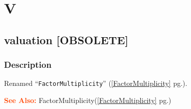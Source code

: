 \documentclass[a4paper]{mybook}
\newenvironment{command}{}{} %
\newcommand\SeeAlso{\par\textcolor{OrangeRed}{\textbf{\large See Also: }}}
\begin{document}
\chapter{V}  %
\label{V}

\section{valuation [OBSOLETE]}
\label{valuation [OBSOLETE]}
\begin{command} %



\subsection*{Description}

Renamed ``\verb&FactorMultiplicity&'' (\ref{FactorMultiplicity} pg.\pageref{FactorMultiplicity}).

\SeeAlso %
  FactorMultiplicity(\ref{FactorMultiplicity} pg.\pageref{FactorMultiplicity})
\end{command} %
\end{document}

